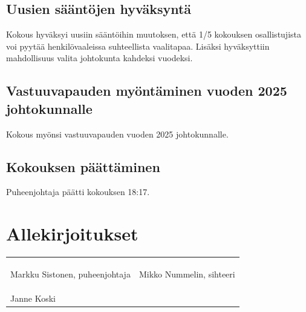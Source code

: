 \documentclass[a4paper,12pt]{article}
\begin{document}
\subsection{Uusien sääntöjen hyväksyntä}
Kokous hyväksyi uusiin sääntöihin muutoksen, että 1/5 kokouksen osallistujista voi pyytää henkilövaaleissa suhteellista vaalitapaa. Lisäksi hyväksyttiin mahdollisuus valita johtokunta kahdeksi vuodeksi.
\subsection{Vastuuvapauden myöntäminen vuoden 2025 johtokunnalle}
Kokous myönsi vastuuvapauden vuoden 2025 johtokunnalle.
\subsection{Kokouksen päättäminen}
Puheenjohtaja päätti kokouksen 18:17.
\section*{Allekirjoitukset}
\begin{flushleft}
\begin{tabular}{ll}
& \\
& \\
& \\
Markku Sistonen, puheenjohtaja &
Mikko Nummelin, sihteeri \\
& \\
& \\
& \\
Janne Koski
\end{tabular}
\end{flushleft}
\end{document}
